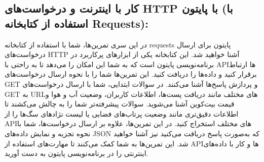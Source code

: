 \documentclass[b5paper,12pt]{article}
\begin{document}
	\subsection*{کار با اینترنت و درخواست‌های HTTP با پایتون (با استفاده از کتابخانه Requests):}
	در این سری تمرین‌ها، شما با استفاده از کتابخانه requests پایتون برای ارسال درخواست‌های HTTP آشنا خواهید شد. این کتابخانه یکی از ابزارهای پرکاربرد در برنامه‌نویسی پایتون است که به شما این امکان را می‌دهد تا به راحتی با APIها ارتباط برقرار کنید و داده‌ها را دریافت کنید. این تمرین‌ها شما را با نحوه ارسال درخواست‌های GET و پردازش پاسخ‌ها آشنا می‌کنند.
	در سوالات ابتدایی، شما با ارسال درخواست‌های GET به URLهای مختلف مانند دریافت پست‌ها، اطلاعات کاربران، وضعیت آب و هوا و قیمت بیت‌کوین آشنا می‌شوید. سوالات پیشرفته‌تر شما را به چالش می‌کشند تا اطلاعات دقیق‌تری مانند وضعیت پرتاب‌های فضایی یا لیست نژادهای سگ‌ها را از APIهای مختلف استخراج کنید. در این تمرین‌ها، علاوه بر ارسال درخواست‌ها، شما با نحوه تجزیه و نمایش داده‌های JSON که به‌صورت پاسخ دریافت می‌کنید نیز آشنا خواهید شد. این تمرین‌ها به شما کمک می‌کنند تا مهارت‌های استفاده از APIها و کار با داده‌های اینترنتی را در برنامه‌نویسی پایتون به دست آورید.
	
\end{document}

